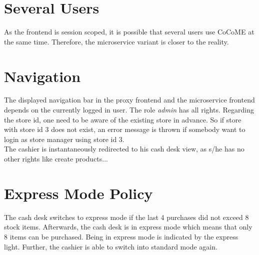 \section{Several Users}
As the frontend is session scoped, it is possible that several users use CoCoME at the same time. Therefore, the microservice variant is closer to the reality.

\section{Navigation}
The displayed navigation bar in the proxy frontend and the microservice frontend depends on the currently logged in user. The role \textit{admin} has all rights. Regarding the store id, one need to be aware of the existing store in advance. So if store with store id 3 does not exist, an error message is thrown if somebody want to login as store manager using store id 3. \\
The cashier is instantaneously redirected to his cash desk view, as s/he has no other rights like create products...

\section{Express Mode Policy}
The cash desk switches to express mode if the last 4 purchases did not exceed 8 stock items. Afterwards, the cash desk is in express mode which means that only 8 items can be purchased. Being in express mode is indicated by the express light. Further, the cashier is able to switch into standard mode again.















